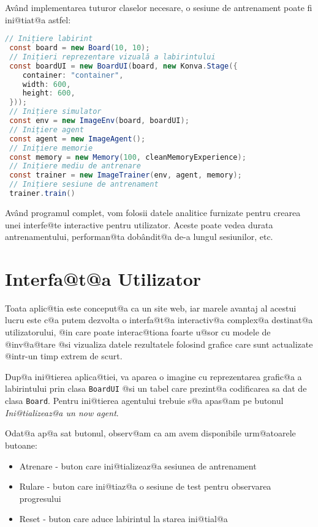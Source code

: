 Av\^ and implementarea tuturor claselor necesare, o sesiune de antrenament poate fi ini@tiat@a astfel:

\begin{lstlisting}[language=Java, caption={Inițierea unei sesiuni complete de antrenament}]
 // Inițiere labirint
 const board = new Board(10, 10);
 // Inițieri reprezentare vizuală a labirintului
 const boardUI = new BoardUI(board, new Konva.Stage({
	container: "container",
	width: 600,
	height: 600,
 }));
 // Inițiere simulator
 const env = new ImageEnv(board, boardUI);
 // Inițiere agent
 const agent = new ImageAgent();
 // Inițiere memorie
 const memory = new Memory(100, cleanMemoryExperience);
 // Inițiere mediu de antrenare
 const trainer = new ImageTrainer(env, agent, memory);
 // Inițiere sesiune de antrenament
 trainer.train()
\end{lstlisting}

Av\^ and programul complet, vom folosii datele analitice furnizate pentru crearea unei interfe@te interactive pentru utilizator. Aceste poate vedea durata antrenamentului, performan@ta dob\^ andit@a de-a lungul sesiunilor, etc.

\section{Interfa@t@a Utilizator}

Toata aplic@tia este conceput@a ca un site web, iar marele avantaj al acestui lucru este c@a putem dezvolta o interfa@t@a interactiv@a complex@a destinat@a utilizatorului, @in care poate interac@tiona foarte u@sor cu modele de @inv@a@tare @si vizualiza datele rezultatele folosind grafice care sunt actualizate @intr-un timp extrem de scurt.

Dup@a ini@tierea aplica@tiei, va aparea o imagine cu reprezentarea grafic@a a labirintului prin clasa \texttt{BoardUI} @si un tabel care prezint@a codificarea sa dat de clasa \texttt{Board}. Pentru ini@tierea agentului trebuie s@a apas@am pe butonul \textsl{Ini@tializeaz@a un now agent}.

Odat@a ap@a
sat butonul, observ@am ca am avem disponibile urm@atoarele butoane:
\begin{itemize}
	\item Atrenare - buton care ini@tializeaz@a sesiunea de antrenament
	\item Rulare - buton care ini@tiaz@a o sesiune de test pentru observarea progresului
	\item Reset - buton care aduce labirintul la starea ini@tial@a
\end{itemize}

